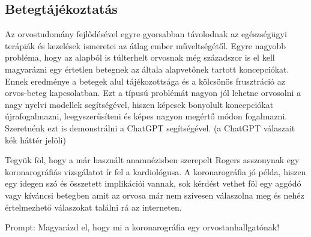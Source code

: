 \documentclass{article}
\begin{document}
\begin{multicols}{2}
\subsection{Betegtájékoztatás}
Az orvostudomány fejlődésével egyre gyorsabban távolodnak az egészségügyi terápiák és kezelések ismeretei az átlag ember műveltségétől. Egyre nagyobb probléma, hogy az alapból is túlterhelt orvosnak még századszor is el kell magyarázni egy értetlen betegnek az általa alapvetőnek tartott koncepciókat. Ennek eredménye a betegek alul tájékozottsága és a kölcsönös frusztráció az orvos-beteg kapcsolatban. Ezt a típusú problémát nagyon jól lehetne orvosolni a nagy nyelvi modellek segítségével, hiszen képesek bonyolult koncepciókat újrafogalmazni, leegyszerűsíteni és képes nagyon megértő módon fogalmazni. Szeretnénk ezt is demonstrálni a ChatGPT segítségével. (a ChatGPT válaszait kék háttér jelöli)

Tegyük föl, hogy a már használt anamnézisben szerepelt Rogers asszonynak egy koronarográfiás vizsgálatot ír fel a kardiológusa. A koronarográfia jó példa, hiszen egy idegen szó és összetett implikációi vannak, sok kérdést vethet föl egy aggódó vagy kíváncsi betegben amit az orvosa már nem szívesen válaszolna meg és nehéz értelmezhető válaszokat találni rá az interneten.

Prompt: Magyarázd el, hogy mi a koronarográfia egy orvostanhallgatónak!


\end{multicols}
\end{document}
